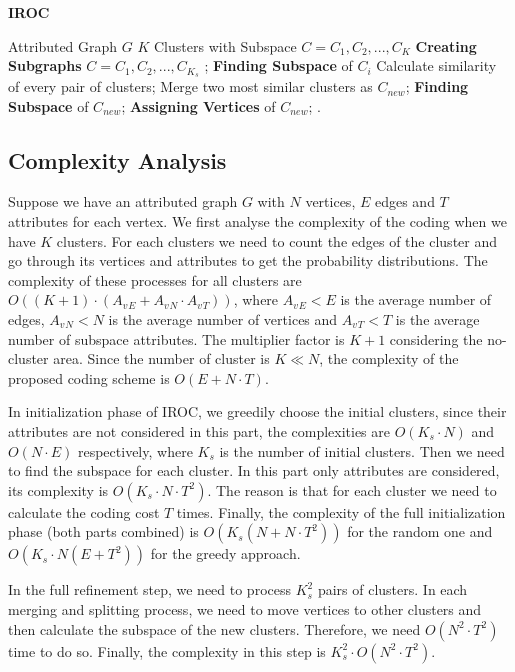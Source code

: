 \begin{algorithm}[htbp]
\caption{\textbf{IROC}}
\label{alg:GraphClustering}
\begin{algorithmic}[1]
\REQUIRE
    Attributed Graph $G$
\ENSURE
    $K$ Clusters with Subspace $C = {C_1, C_2,...,C_K}$
\STATE \textbf{Creating Subgraphs} $C = {C_1, C_2,...,C_{K_s}}$ ;
\STATE \textbf{Finding Subspace} of $C_i$
\ENDFOR
{}
\STATE Calculate similarity of every pair of clusters;
\STATE Merge two most similar clusters as $C_{new}$;
\STATE \textbf{Finding Subspace} of $C_{new}$;
\STATE \textbf{Assigning Vertices} of $C_{new}$;
\ENDWHILE
{}.
\end{algorithmic}
\end{algorithm}

\subsection{Complexity Analysis}
\noindent Suppose we have an attributed graph $G$ with $N$ vertices, $E$ edges and $T$ attributes for each vertex. We first analyse the complexity of the coding when we have $K$ clusters. For each clusters we need to count the edges of the cluster and go through its vertices and attributes to get the probability distributions. The complexity of these processes for all clusters are $O((K+1)\cdot(A_v{_E}+A_v{_N}\cdot A_v{_T}))$, where $A_v{_E} < E$ is the average number of edges, $A_v{_N} < N$ is the average number of vertices and $A_v{_T} < T$ is the average number of subspace attributes. The multiplier factor is $K+1$ considering the no-cluster area. Since the number of cluster is $K \ll N$, the complexity of the proposed coding scheme is $O(E+N\cdot T)$.

In initialization phase of IROC, we greedily choose the initial clusters, since their attributes are not considered in this part, the complexities are $O(K_s\cdot N)$ and $O(N\cdot E)$ respectively, where $K_s$ is the number of initial clusters. Then we need to find the subspace for each cluster. In this part only attributes are considered, its complexity is $O(K_s \cdot N\cdot T^2)$. The reason is that for each cluster we need to calculate the coding cost $T$ times. Finally, the complexity of the full initialization phase (both parts combined) is $O(K_s(N + N\cdot T^2))$ for the random one and $O(K_s\cdot N(E+T^2))$ for the greedy approach.

In the full refinement step, we need to process $K_s^2$ pairs of clusters. In each merging and splitting process, we need to move vertices to other clusters and then calculate the subspace of the new clusters. Therefore, we need $O(N^2\cdot T^2)$ time to do so. Finally, the complexity in this step is $K_s^2\cdot O(N^2\cdot T^2)$.




